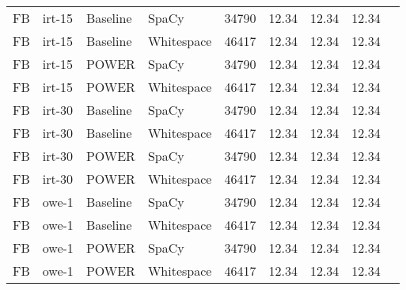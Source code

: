\begin{tabular}{| l | l | l | l | r | r | r | r | r |}
    FB & irt-15 & Baseline & SpaCy & \num{34790} &
    12.34 & 12.34 & 12.34 \\

    FB & irt-15 & Baseline & Whitespace & \num{46417} &
    12.34 & 12.34 & 12.34 \\

    FB & irt-15 & POWER & SpaCy & \num{34790} & 12.34 &
    12.34 & 12.34 \\

    FB & irt-15 & POWER & Whitespace & \num{46417} &
    12.34 & 12.34 & 12.34 \\

    \hline

    FB & irt-30 & Baseline & SpaCy & \num{34790} &
    12.34 & 12.34 & 12.34 \\

    FB & irt-30 & Baseline & Whitespace & \num{46417} &
    12.34 & 12.34 & 12.34 \\

    FB & irt-30 & POWER & SpaCy & \num{34790} & 12.34 &
    12.34 & 12.34 \\

    FB & irt-30 & POWER & Whitespace & \num{46417} &
    12.34 & 12.34 & 12.34 \\

    \hline

    FB & owe-1 & Baseline & SpaCy & \num{34790} &
    12.34 & 12.34 & 12.34 \\

    FB & owe-1 & Baseline & Whitespace & \num{46417} &
    12.34 & 12.34 & 12.34 \\

    FB & owe-1 & POWER & SpaCy & \num{34790} & 12.34 &
    12.34 & 12.34 \\

    FB & owe-1 & POWER & Whitespace & \num{46417} &
    12.34 & 12.34 & 12.34 \\

    \hline
\end{tabular}
